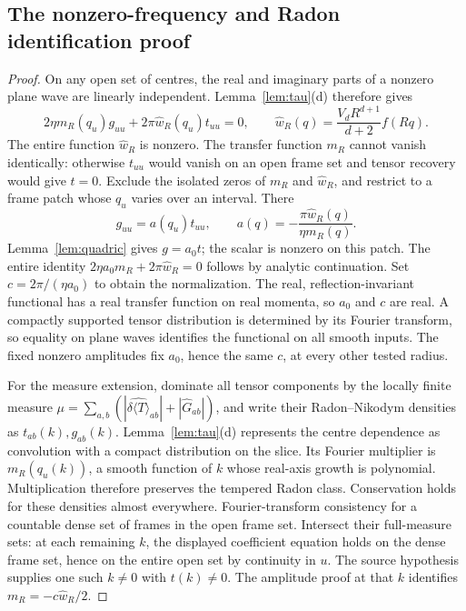 \documentclass[12pt]{article}
\theoremstyle{definition}
\theoremstyle{remark}
\newcommand{\dT}{\delta\langle T\rangle}
\begin{document}
\subsection{The nonzero-frequency and Radon identification proof}
\label{app:thm:uniqueness}
\begin{proof}
On any open set of centres, the real and imaginary parts of a nonzero plane wave
are linearly independent. Lemma~\ref{lem:tau}(d) therefore gives
\[
2\eta m_R(q_u)g_{uu}+2\pi\widehat w_R(q_u)t_{uu}=0,\qquad
\widehat w_R(q)=\frac{V_dR^{d+1}}{d+2}f(Rq).
\]
The entire function \(\widehat w_R\) is nonzero. The transfer function \(m_R\)
cannot vanish identically: otherwise \(t_{uu}\) would vanish on an open frame set
and tensor recovery would give \(t=0\).
Exclude the isolated zeros of \(m_R\) and \(\widehat w_R\), and restrict to a
frame patch whose \(q_u\) varies over an interval. There
\[
g_{uu}=a(q_u)t_{uu},\qquad
a(q)=-\frac{\pi\widehat w_R(q)}{\eta m_R(q)}.
\]
Lemma~\ref{lem:quadric} gives \(g=a_0t\); the scalar is nonzero on this patch.
The entire identity
\(2\eta a_0m_R+2\pi\widehat w_R=0\) follows by analytic continuation.
Set \(c=2\pi/(\eta a_0)\) to obtain the normalization.
The real, reflection-invariant functional has a real transfer function on real momenta,
so \(a_0\) and \(c\) are real.
A compactly supported tensor distribution is determined by its Fourier transform,
so equality on plane waves identifies the functional on all smooth inputs.
The fixed nonzero amplitudes fix \(a_0\), hence the same \(c\), at every other
tested radius.

For the measure extension, dominate all tensor components by the locally finite measure
\(\mu=\sum_{a,b}(|\widehat{\dT}_{ab}|+|\widehat G_{ab}|)\), and write their
Radon--Nikodym densities as \(t_{ab}(k),g_{ab}(k)\).
Lemma~\ref{lem:tau}(d) represents the centre dependence as convolution with a compact
distribution on the slice. Its Fourier multiplier is \(m_R(q_u(k))\), a smooth
function of \(k\) whose real-axis growth is polynomial. Multiplication therefore
preserves the tempered Radon class. Conservation holds for these
densities almost everywhere. Fourier-transform consistency for a countable dense set
of frames in the open frame set. Intersect their full-measure sets: at each remaining
\(k\), the displayed coefficient equation holds on the dense frame set, hence on
the entire open set by continuity in \(u\). The source hypothesis supplies one
such \(k\ne0\) with \(t(k)\ne0\). The amplitude proof at that \(k\) identifies
\(m_R=-c\widehat w_R/2\).


\end{proof}
\end{document}

